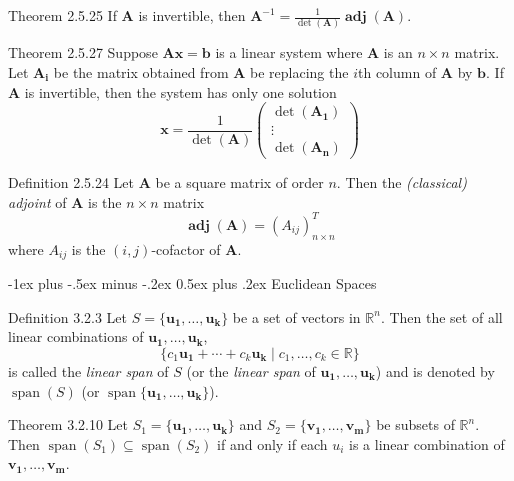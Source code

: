 \documentclass[10pt,landscape]{article}
\makeatletter
\renewcommand{\section}{\@startsection{section}{1}{0mm}%
                                {-1ex plus -.5ex minus -.2ex}%
                                {0.5ex plus .2ex}%
                                {\normalfont\large\bfseries}}
\newcommand{\matr}[1]{\bm{#1}}
\newcommand{\vect}[1]{\bm{#1}}
\newcommand{\adj}{\operatorname{\textbf{adj}}}
\newcommand{\lspan}{\operatorname{span}}
\theoremstyle{definition}
\newcommand{\thistheoremname}{}
\newtheorem*{genericthm*}{\thistheoremname}
\newenvironment{namedthm*}[1]
{\renewcommand{\thistheoremname}{#1}\begin{genericthm*}}
{\end{genericthm*}}
\makeatother
\begin{document}
\begin{multicols}{3}
\begin{namedthm*}{Theorem 2.5.25}
    If \(\matr{A}\) is invertible, then \(\matr{A}^{-1} = \frac{1}{\det(\matr{A})}\adj(\matr{A})\).
\end{namedthm*}

\begin{namedthm*}{Theorem 2.5.27}
    Suppose \(\matr{A}\vect{x} = \vect{b}\) is a linear system where \(\matr{A}\) is an \(n \times n\) matrix. Let \(\matr{A_i}\) be the matrix obtained from \(\matr{A}\) be replacing the \(i\)th column of \(\matr{A}\) by \(\vect{b}\). If \(\matr{A}\) is invertible, then the system has only one solution
    \[
        \vect{x} = \frac{1}{\det(\matr{A})}\begin{pmatrix}\det\left(\matr{A_1}\right) \\ \vdots \\ \det\left(\matr{A_n}\right) \end{pmatrix}
    \]
\end{namedthm*}

\begin{namedthm*}{Definition 2.5.24}
    Let \(\matr{A}\) be a square matrix of order \(n\). Then the \textit{(classical) adjoint} of \(\matr{A}\) is the \(n \times n\) matrix
    \[
        \adj(\matr{A}) = \left(A_{ij}\right)_{n \times n}^T
    \]
    where \(A_{ij}\) is the \((i, j)\)-cofactor of \(\matr{A}\).
\end{namedthm*}

\section{Euclidean Spaces}

\begin{namedthm*}{Definition 3.2.3}
    Let \(S = \{\vect{u_1}, \dots, \vect{u_k}\}\) be a set of vectors in \(\mathbb{R}^n\). Then the set of all linear combinations of \(\vect{u_1}, \dots, \vect{u_k}\),
    \[
        \{c_1\vect{u_1} + \cdots + c_k\vect{u_k} \mid c_1, \dots, c_k \in \mathbb{R}\}
    \]
    is called the \textit{linear span} of \(S\) (or the \textit{linear span} of \(\vect{u_1}, \dots, \vect{u_k}\)) and is denoted by \(\lspan(S)\) (or \(\lspan \{\vect{u_1}, \dots, \vect{u_k} \}\)).
\end{namedthm*}

\begin{namedthm*}{Theorem 3.2.10}
    Let \(S_1 = \{\vect{u_1}, \dots, \vect{u_k}\}\) and \(S_2 = \{\vect{v_1}, \dots, \vect{v_m}\}\) be subsets of \(\mathbb{R}^n\). Then \(\lspan\left(S_1\right) \subseteq \lspan \left(S_2\right)\) if and only if each \(u_i\) is a linear combination of \(\vect{v_1}, \dots, \vect{v_m}\).
\end{namedthm*}


\end{multicols}
\end{document}
